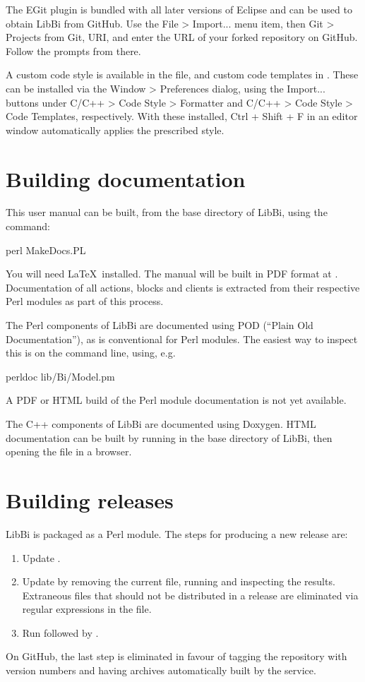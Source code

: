 The EGit plugin is bundled with all later versions of Eclipse and can be used
to obtain LibBi from GitHub. Use the \textsf{File > Import...} menu item, then
\textsf{Git > Projects from Git}, \textsf{URI}, and enter the URL of your
forked repository on GitHub. Follow the prompts from there.

 A custom code style is available
in the  file, and custom code templates
in . These can be installed via the
\textsf{Window > Preferences} dialog, using the \textsf{Import...} buttons
under \textsf{C/C++ > Code Style > Formatter} and \textsf{C/C++ > Code Style >
  Code Templates}, respectively. With these installed, \textsf{Ctrl + Shift +
  F} in an editor window automatically applies the prescribed style.

\section{Building documentation}

This user manual can be built, from the base directory of LibBi, using the
command:
\begin{cmdcode}
perl MakeDocs.PL
\end{cmdcode}
You will need \LaTeX\ installed. The manual will be built in PDF format at
. Documentation of all actions, blocks and clients is
extracted from their respective Perl modules as part of this process.

The Perl components of LibBi are documented using POD (``Plain Old
Documentation''), as is conventional for Perl modules. The easiest way to
inspect this is on the command line, using, e.g.
\begin{cmdcode}
perldoc lib/Bi/Model.pm
\end{cmdcode}
A PDF or HTML build of the Perl module documentation is not yet available.

The C++ components of LibBi are documented using Doxygen. HTML documentation
can be built by running  in the base directory of LibBi, then
opening the  file in a browser.

\section{Building releases}

LibBi is packaged as a Perl module. The steps for producing a new release are:
\begin{enumerate}
\item Update .
\item Update  by removing the current file, running  and inspecting the results. Extraneous files that should
  not be distributed in a release are eliminated via regular expressions in
  the  file.
\item Run  followed by .
\end{enumerate}
On GitHub, the last step is eliminated in favour of tagging the repository
with version numbers and having archives automatically built by the service.

